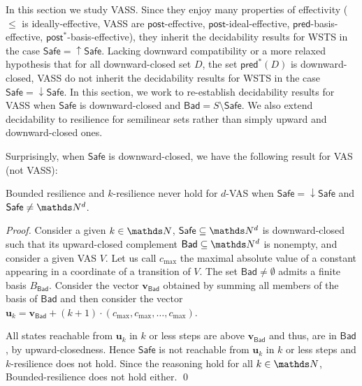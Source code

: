 \documentclass[runningheads]{llncs}
\newcommand{\pred}{\textsf{pred}}
\newcommand{\post}{\textsf{post}}
\newcommand{\Bad}{\textsf{Bad}}
\newcommand{\Safe}{\textsf{Safe}}
\begin{document}
In this section we study VASS. Since they enjoy many properties of effectivity ($\leq$ is ideally-effective, VASS are $\post$-effective, $\post$-ideal-effective, $\pred$-basis-effective, $\post^*$-basis-effective), they inherit the decidability results for WSTS in the case 
$\Safe = \mathop{\uparrow} \Safe$. Lacking downward compatibility or a more relaxed hypothesis that
for all downward-closed set $D$, the set $\pred^*(D)$ is downward-closed, 
VASS do not inherit the decidability results for WSTS in the case $\Safe = \mathop{\downarrow} \Safe$.
In this section, we work to re-establish decidability results for VASS when $\Safe$ is downward-closed and $\Bad = S \setminus \Safe$. We also extend decidability to resilience for semilinear sets rather than simply upward and downward-closed ones.




Surprisingly, when $\Safe$ is downward-closed, we have the following result for VAS (not VASS):
\begin{proposition}
{\sc Bounded resilience} and {\sc $k$-resilience} never hold for $d$-VAS when $\Safe = \mathop{\downarrow} \Safe$ and $\Safe \neq \N^d$.
\end{proposition}


\begin{proof}
Consider a given $k \in \N$, $\Safe \subseteq \N^d$ is downward-closed
 such that its upward-closed complement $\Bad \subseteq \N^d$ is nonempty, and
consider a given VAS $V$. 
Let us call $c_{\max}$ the maximal absolute value of a constant appearing in a coordinate of a transition of $V$.
The set $\Bad \neq \emptyset$ admits a finite basis $B_\Bad$.
Consider the vector $\textbf{v}_{\Bad}$ obtained by summing all members of the basis of $\Bad$ and then consider the vector
$\textbf{u}_k = \textbf{v}_{\Bad} + (k+1) \cdot (c_{\max}, c_{\max}, \ldots, c_{\max})$.

All states reachable from $\textbf{u}_k$ in $k$ or less steps are above $ \textbf{v}_{\Bad} $
and thus, are in $\Bad$, by upward-closedness.
Hence  $\Safe$ is not reachable from $\textbf{u}_k$ in $k$ or less steps  and {$k$-resilience} does not hold.
Since the reasoning hold for all $k \in \N$, {\sc Bounded-resilience} does not hold either.
\qed
\end{proof}
\end{document}
